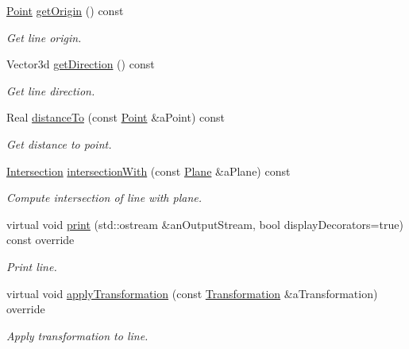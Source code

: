 \begin{DoxyCompactItemize}
\hyperlink{classostk_1_1math_1_1geom_1_1d3_1_1objects_1_1_point}{Point} \hyperlink{classostk_1_1math_1_1geom_1_1d3_1_1objects_1_1_line_afc9e2dbb4641c031b91c4b8019a41b69}{get\+Origin} () const
\begin{DoxyCompactList}\small\item\em Get line origin. \end{DoxyCompactList}\item 
Vector3d \hyperlink{classostk_1_1math_1_1geom_1_1d3_1_1objects_1_1_line_a7f312d93308a5f0a876d69c46662838b}{get\+Direction} () const
\begin{DoxyCompactList}\small\item\em Get line direction. \end{DoxyCompactList}\item 
Real \hyperlink{classostk_1_1math_1_1geom_1_1d3_1_1objects_1_1_line_acbc844b79bd79c92641828baefee8eb7}{distance\+To} (const \hyperlink{classostk_1_1math_1_1geom_1_1d3_1_1objects_1_1_point}{Point} \&a\+Point) const
\begin{DoxyCompactList}\small\item\em Get distance to point. \end{DoxyCompactList}\item 
\hyperlink{classostk_1_1math_1_1geom_1_1d3_1_1_intersection}{Intersection} \hyperlink{classostk_1_1math_1_1geom_1_1d3_1_1objects_1_1_line_a3dba3152c9257eb58f2437c687e410db}{intersection\+With} (const \hyperlink{classostk_1_1math_1_1geom_1_1d3_1_1objects_1_1_plane}{Plane} \&a\+Plane) const
\begin{DoxyCompactList}\small\item\em Compute intersection of line with plane. \end{DoxyCompactList}\item 
virtual void \hyperlink{classostk_1_1math_1_1geom_1_1d3_1_1objects_1_1_line_ad3e7bf31cdde2d265dd9ff644b341f2d}{print} (std\+::ostream \&an\+Output\+Stream, bool display\+Decorators=true) const override
\begin{DoxyCompactList}\small\item\em Print line. \end{DoxyCompactList}\item 
virtual void \hyperlink{classostk_1_1math_1_1geom_1_1d3_1_1objects_1_1_line_ab12eb788b966601d6d09f75196a30d6f}{apply\+Transformation} (const \hyperlink{classostk_1_1math_1_1geom_1_1d3_1_1_transformation}{Transformation} \&a\+Transformation) override
\begin{DoxyCompactList}\small\item\em Apply transformation to line. \end{DoxyCompactList}\end{DoxyCompactItemize}

